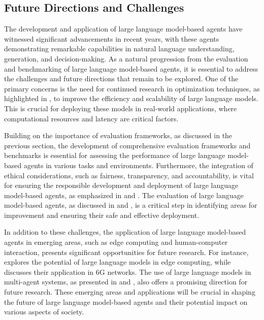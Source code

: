 \documentclass[11pt,a4paper]{article}
\begin{document}
\subsection{Future Directions and Challenges}


The development and application of large language model-based agents have witnessed significant advancements in recent years, with these agents demonstrating remarkable capabilities in natural language understanding, generation, and decision-making. As a natural progression from the evaluation and benchmarking of large language model-based agents, it is essential to address the challenges and future directions that remain to be explored. One of the primary concerns is the need for continued research in optimization techniques, as highlighted in \cite{arxiv:2312.00678}, to improve the efficiency and scalability of large language models. This is crucial for deploying these models in real-world applications, where computational resources and latency are critical factors.

Building on the importance of evaluation frameworks, as discussed in the previous section, the development of comprehensive evaluation frameworks and benchmarks is essential for assessing the performance of large language model-based agents in various tasks and environments. Furthermore, the integration of ethical considerations, such as fairness, transparency, and accountability, is vital for ensuring the responsible development and deployment of large language model-based agents, as emphasized in \cite{arxiv:2402.06196} and \cite{doi:10.1109/access.2024.3365742}. The evaluation of large language model-based agents, as discussed in \cite{arxiv:2308.03688} and \cite{doi:10.1038/s41746-024-01083-y}, is a critical step in identifying areas for improvement and ensuring their safe and effective deployment.

In addition to these challenges, the application of large language model-based agents in emerging areas, such as edge computing and human-computer interaction, presents significant opportunities for future research. For instance, \cite{doi:10.1109/mnet.2025.3539338} explores the potential of large language models in edge computing, while \cite{doi:10.1109/mwc.005.2400019} discusses their application in 6G networks. The use of large language models in multi-agent systems, as presented in \cite{arxiv:2402.01680} and \cite{doi:10.1145/3712003}, also offers a promising direction for future research. These emerging areas and applications will be crucial in shaping the future of large language model-based agents and their potential impact on various aspects of society.
\end{document}
